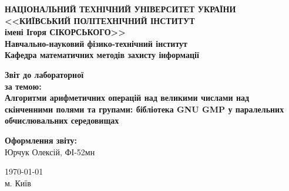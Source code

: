 \thispagestyle{empty}
\linespread{1.1}

\begin{center}
    {\bfseries\large
        НАЦІОНАЛЬНИЙ ТЕХНІЧНИЙ УНІВЕРСИТЕТ УКРАЇНИ \\
        <<КИЇВСЬКИЙ ПОЛІТЕХНІЧНИЙ ІНСТИТУТ \\
        імені Ігоря СІКОРСЬКОГО>> \\
        Навчально-науковий фізико-технічний інститут \\
        \medskip
        Кафедра математичних методів захисту інформації}
\end{center}

\begin{center}
\vspace{40mm}
{\bfseries\huge Звіт до лабораторної } \\
{\bfseries\Large за темою:} \\
{\bfseries\Large Алгоритми арифметичних операцій над великими числами над} \\ 
{\bfseries\Large скінченними полями та групами: бібліотека GNU GMP у паралельних обчислювальних середовищах} \\
\end{center}

\vspace{55mm}
\begin{center}
    \hfill
    \begin{minipage}[t]{0.4\textwidth}
        \begin{flushright}
            \textbf{Оформлення звіту:} \\ 
                Юрчук Олексій, ФІ-52мн \\
        \end{flushright}
    \end{minipage}
\end{center}

\vfill
\begin{center}
    \today \\
    {м. Київ}
\end{center}

\newpage
{}
